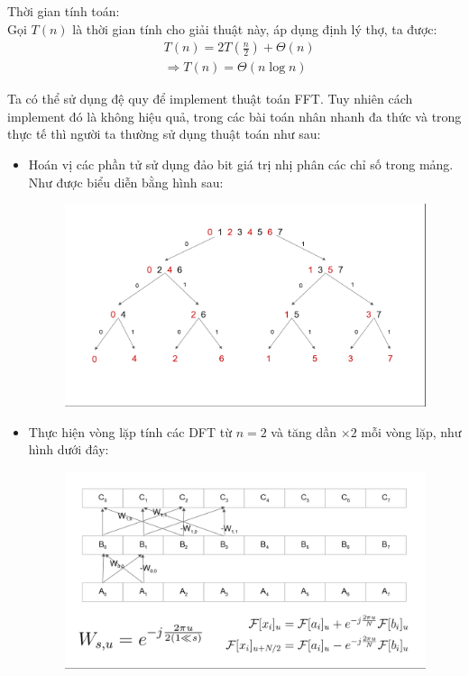 \documentclass[../report.tex]{subfiles}
\begin{document}
\noindent Thời gian tính toán:  \\
Gọi $T(n)$ là thời gian tính cho giải thuật này, áp dụng
định lý thợ, ta được: 
\begin{align*}
    &T\left(n\right) = 2 T\left(\frac{n}{2}\right) 
    + \Theta \left(n\right) \\
    &\Rightarrow T(n) = \Theta \left( n \log n\right)
\end{align*}

\noindent Ta có thể sử dụng đệ quy để implement thuật toán FFT. 
Tuy nhiên cách implement đó là không hiệu quả, trong các bài toán 
nhân nhanh đa thức và trong thực tế thì người ta thường sử dụng 
thuật toán như sau: 
\begin{itemize}
\item Hoán vị các phần tử sử dụng đảo bit 
giá trị nhị phân các chỉ số trong mảng. Như được 
biểu diễn bằng hình sau: 
\begin{figure}[H]
\centering
\includegraphics[width=\textwidth]{figures/swap.png}
\end{figure}
\item Thực hiện vòng lặp tính các DFT từ 
$n = 2$ và tăng dần $\times 2$
mỗi vòng lặp, như hình dưới đây: 
\begin{figure}[H]
\centering
\includegraphics[width=\textwidth]{figures/fft.png}
\end{figure}

\end{itemize}
\end{document}
